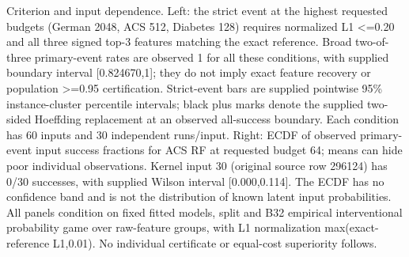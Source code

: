 Criterion and input dependence. Left: the strict event at the highest requested budgets (German 2048, ACS 512, Diabetes 128) requires normalized L1 <=0.20 and all three signed top-3 features matching the exact reference. Broad two-of-three primary-event rates are observed 1 for all these conditions, with supplied boundary interval [0.824670,1]; they do not imply exact feature recovery or population >=0.95 certification. Strict-event bars are supplied pointwise 95\% instance-cluster percentile intervals; black plus marks denote the supplied two-sided Hoeffding replacement at an observed all-success boundary. Each condition has 60 inputs and 30 independent runs/input. Right: ECDF of observed primary-event input success fractions for ACS RF at requested budget 64; means can hide poor individual observations. Kernel input 30 (original source row 296124) has 0/30 successes, with supplied Wilson interval [0.000,0.114]. The ECDF has no confidence band and is not the distribution of known latent input probabilities. All panels condition on fixed fitted models, split and B32 empirical interventional probability game over raw-feature groups, with L1 normalization max(exact-reference L1,0.01). No individual certificate or equal-cost superiority follows.
